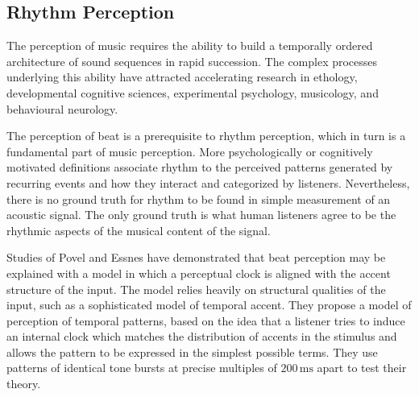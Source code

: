\documentclass{scrartcl}
\begin{document}





\subsection{Rhythm Perception}

The perception of music requires the ability to build a temporally ordered architecture of sound sequences in rapid succession. The complex processes underlying this ability have attracted accelerating research in ethology, developmental cognitive sciences, experimental psychology, musicology, and behavioural neurology.

The perception of beat is a prerequisite to rhythm perception, which in turn is a fundamental part of music perception. More psychologically or cognitively motivated definitions associate rhythm to the perceived patterns generated by recurring events and how they interact and categorized by listeners. Nevertheless, there is no ground truth for rhythm to be found in simple measurement of an acoustic signal. The only ground truth is what human listeners agree to be the rhythmic aspects of the musical content of the signal.

Studies of Povel and Essnes \cite{Povel1985} have demonstrated that beat perception may be explained with a model in which a perceptual clock is aligned with the accent structure of the input. The model relies heavily on structural qualities of the input, such as a sophisticated model of temporal accent. They propose a model of perception of temporal patterns, based on the idea that a listener tries to induce an internal clock which matches the distribution of accents in the stimulus and allows the pattern to be expressed in the simplest possible terms. They use patterns of identical tone bursts at precise multiples of $200\, \text{ms}$ apart to test their theory. 
\end{document}
